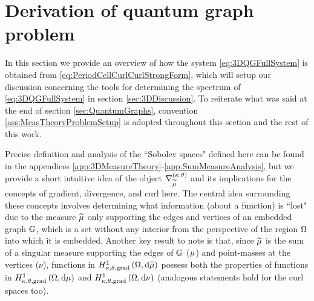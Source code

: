 \section{Derivation of quantum graph problem} \label{sec:3DSystemDerivation}
In this section we provide an overview of how the system \eqref{eq:3DQGFullSystem} is obtained from \eqref{eq:PeriodCellCurlCurlStrongForm}, which will setup our discussion concerning the tools for determining the spectrum of \eqref{eq:3DQGFullSystem} in section \ref{sec:3DDiscussion}.
To reiterate what was said at the end of section \ref{sec:QuantumGraphs}, convention \ref{ass:MeasTheoryProblemSetup} is adopted throughout this section and the rest of this work. 

Precise definition and analysis of the ``Sobolev spaces" defined here can be found in the appendices \ref{app:3DMeasureTheory}-\ref{app:SumMeasureAnalysis}, but we provide a short intuitive idea of the object $\nabla^{\left( \kappa, \theta \right)}_{\widetilde{\mu}}$ and its implications for the concepts of gradient, divergence, and curl here.
The central idea surrounding these concepts involves determining what information (about a function) is ``lost" due to the measure $\widetilde{\mu}$ only supporting the edges and vertices of an embedded graph $\mathbb{G}$, which is a set without any interior from the perspective of the region $\Omega$ into which it is embedded.
Another key result to note is that, since $\widetilde{\mu}$ is the sum of a singular measure supporting the edges of $\mathbb{G}$ ($\mu$) and point-masses at the vertices ($\nu$), functions in $H^1_{\kappa,\theta,\mathrm{grad}}\left( \Omega, \mathrm{d}\widetilde{\mu} \right)$ possess both the properties of functions in $H^1_{\kappa,\theta,\mathrm{grad}}\left( \Omega, \mathrm{d}\mu \right)$ and $H^1_{\kappa,\theta,\mathrm{grad}}\left( \Omega, \mathrm{d}\nu \right)$ (analogous statements hold for the curl spaces too).

